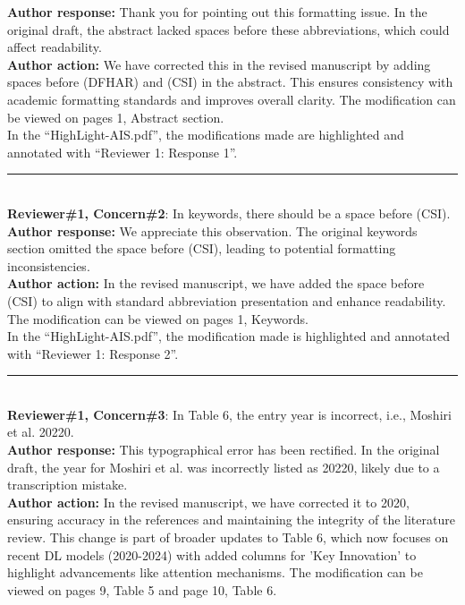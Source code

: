 \documentclass[Afour,sageh,times]{sagej}
\begin{document}
\textbf{Author response:} Thank you for pointing out this formatting issue. In the original draft, the abstract lacked spaces before these abbreviations, which could affect readability.\\
\textbf{Author action:} We have corrected this in the revised manuscript by adding spaces before (DFHAR) and (CSI) in the abstract. This ensures consistency with academic formatting standards and improves overall clarity. The modification can be viewed on pages 1, Abstract section.\\

\textcolor{myOrange}{ In the “HighLight-AIS.pdf”, the modifications made are highlighted and annotated with “Reviewer 1: Response 1”. }\\
  
\color{gray}\rule{\linewidth}{1pt}\normalcolor\\

\textcolor{myGreen}{ \textbf{Reviewer\#1, Concern\#2}: In keywords, there should be a space before (CSI).}  \\
 
\textbf{Author response:} We appreciate this observation. The original keywords section omitted the space before (CSI), leading to potential formatting inconsistencies.\\
\textbf{Author action:} In the revised manuscript, we have added the space before (CSI) to align with standard abbreviation presentation and enhance readability. The modification can be viewed on pages 1, Keywords.\\

\textcolor{myOrange}{In the “HighLight-AIS.pdf”, the modification made is highlighted and annotated with “Reviewer 1: Response 2”. }\\
 
\color{gray}\rule{\linewidth}{1pt}\normalcolor\\

\textcolor{myGreen}{ \textbf{Reviewer\#1, Concern\#3}: In Table 6, the entry year is incorrect, i.e., Moshiri et al. 20220.}  \\

\textbf{Author response:} This typographical error has been rectified. In the original draft, the year for Moshiri et al. was incorrectly listed as 20220, likely due to a transcription mistake.\\
\textbf{Author action:} In the revised manuscript, we have corrected it to 2020, ensuring accuracy in the references and maintaining the integrity of the literature review. This change is part of broader updates to Table 6, which now focuses on recent DL models (2020-2024) with added columns for 'Key Innovation' to highlight advancements like attention mechanisms. The modification can be viewed on pages 9, Table 5 and page 10, Table 6.\\
\end{document}
